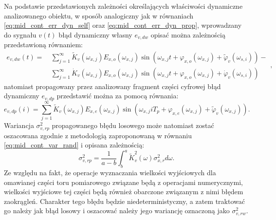 Na podstawie przedstawionych zależności określających właściwości dynamiczne analizowanego obiektu, w sposób analogiczny jak w równaniach \eqref{eq:mid_cont_err_dyn_self} oraz \eqref{eq:mid_cont_err_dyn_prop}, wprowadzany do sygnału $v(t)$ błąd dynamiczny własny $e_{v,dw}$ opisać można zależnością przedstawioną równaniem:
\begin{equation}
\begin{split}
e_{v,dw} \left( t \right) = ~
& \sum _{j = 1} ^{\infty} \tilde{K}_{v} \left( \omega_{x,j} \right) E_{x,o} \left( \omega_{x,j} \right) \sin \left( \omega_{x,j} t + \varphi_{x,o} \left( \omega_{x,j} \right) + \tilde{\varphi}_{v} \left( \omega_{s,i} \right) \right) - \\
& \sum _{j = 1} ^{\infty} \dot{K}_{v} \left( \omega_{x,j} \right) E_{x,o} \left( \omega_{x,j} \right) \sin \left( \omega_{x,j} t + \varphi_{x,o} \left( \omega_{x,j} \right) + \dot{\varphi}_{v} \left( \omega_{s,i} \right) \right)
\end{split}
\label{eq:mid_disc_err_dyn_self},
\end{equation}
natomiast propagowany przez analizowany fragment części cyfrowej błąd dynamiczny $e_{v,dp}$ przedstawić można za pomocą równania:
\begin{equation}
e_{v,dp} \left( i \right) = \sum _{j = 1} ^{\infty} \tilde{K}_{v} \left( \omega_{x,j} \right) E_{x,e} \left( \omega_{x,j} \right) \sin \left( \omega_{x,j} iT_{p} + \varphi_{x,e} \left( \omega_{x,j} \right) + \tilde{\varphi}_{v} \left( \omega_{x,j} \right) \right) \label{eq:mid_disc_err_dyn_prop}.
\end{equation}
Wariancja $\sigma_{v,rp}^{2}$ propagowanego błędu losowego może natomiast zostać oszacowana zgodnie z metodologią zaproponowaną w równaniu \eqref{eq:mid_cont_var_rand} i opisana zależnością:
\begin{equation}
\sigma_{v,rp}^{2} = \frac{1}{a - b} \int _{b} ^{a} \tilde{K}_{v}^{2} \left( \omega \right) \sigma_{x,r}^{2} d\omega \label{eq:mid_disc_var_rand}.
\end{equation}
Ze względu na fakt, że operacje wyznaczania wielkości wyjściowych dla omawianej części toru pomiarowego związane będą z operacjami numerycznymi, wielkości wyjściowe tej części będą również obarczone związanym z nimi błędem zaokrągleń. Charakter tego błędu będzie niedeterministyczny, a zatem traktować go należy jak błąd losowy i oszacować należy jego wariancję oznaczoną jako $\sigma_{v,rw}^{2}$.

